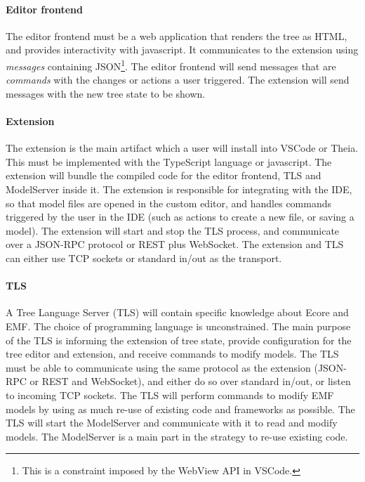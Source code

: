 \paragraph{Editor frontend}
The editor frontend must be a web application that renders the tree as HTML, and provides interactivity with javascript. 
It communicates to the extension using \textit{messages} containing \gls{JSON}\footnote{This is a constraint imposed by the WebView API in VSCode.}.
The editor frontend will send messages that are \textit{commands} with the changes or actions a user triggered.
The extension will send messages with the new tree state to be shown.

\paragraph{Extension}
The extension is the main artifact which a user will install into \gls{VSCode} or \gls{Theia}.
This must be implemented with the \gls{TypeScript} language or javascript.
The extension will bundle the compiled code for the editor frontend, TLS and ModelServer inside it.
The extension is responsible for integrating with the \gls{IDE}, so that model files are opened in the custom editor, and handles commands triggered by the user in the \gls{IDE} (such as actions to create a new file, or saving a model).
The extension will start and stop the TLS process, and communicate over a \gls{JSON-RPC} protocol or \gls{REST} plus \gls{WebSocket}.
The extension and TLS can either use TCP sockets or standard in/out as the transport.

\paragraph{TLS}
A Tree Language Server (TLS) will contain specific knowledge about \gls{Ecore} and \acrshort{EMF}.
The choice of programming language is unconstrained.
The main purpose of the TLS is informing the extension of tree state, provide configuration for the tree editor and extension, and receive commands to modify models.
The TLS must be able to communicate using the same protocol as the extension (\gls{JSON-RPC} or \gls{REST} and \gls{WebSocket}), and either do so over standard in/out, or listen to incoming TCP sockets.
The TLS will perform commands to modify \acrshort{EMF} models by using as much re-use of existing code and frameworks as possible.
The TLS will start the ModelServer and communicate with it to read and modify models.
The ModelServer is a main part in the strategy to re-use existing code.

